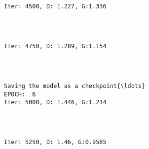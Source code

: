 \documentclass[11pt]{article}
\begin{document}
    \begin{center}
    \end{center}
    { \hspace*{\fill} \\}
    
    \begin{Verbatim}[commandchars=\\\{\}]

Iter: 4500, D: 1.227, G:1.336
    \end{Verbatim}

    \begin{center}
    \end{center}
    { \hspace*{\fill} \\}
    
    \begin{Verbatim}[commandchars=\\\{\}]

Iter: 4750, D: 1.289, G:1.154
    \end{Verbatim}

    \begin{center}
    \end{center}
    { \hspace*{\fill} \\}
    
    \begin{Verbatim}[commandchars=\\\{\}]

Saving the model as a checkpoint{\ldots}
EPOCH:  6
Iter: 5000, D: 1.446, G:1.214
    \end{Verbatim}

    \begin{center}
    \end{center}
    { \hspace*{\fill} \\}
    
    \begin{Verbatim}[commandchars=\\\{\}]

Iter: 5250, D: 1.46, G:0.9585
    \end{Verbatim}
\end{document}
